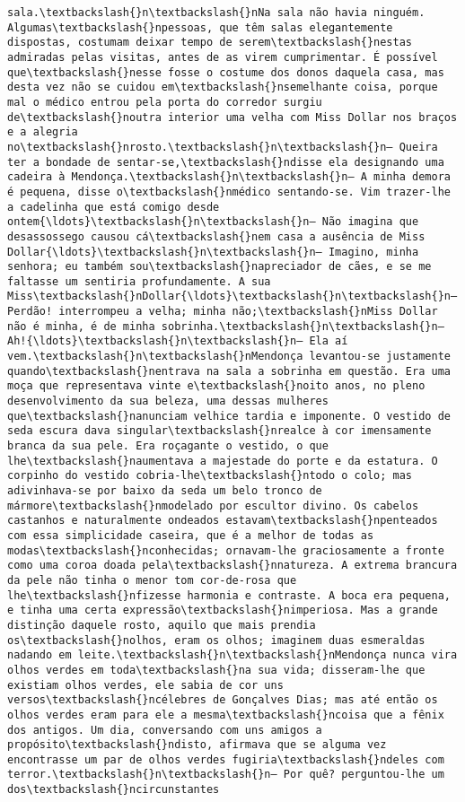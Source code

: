 \documentclass[11pt]{article}
\begin{document}
\begin{Verbatim}[commandchars=\\\{\}]
sala.\textbackslash{}n\textbackslash{}nNa sala não havia ninguém. Algumas\textbackslash{}npessoas, que têm salas elegantemente dispostas, costumam deixar tempo de serem\textbackslash{}nestas admiradas pelas visitas, antes de as virem cumprimentar. É possível que\textbackslash{}nesse fosse o costume dos donos daquela casa, mas desta vez não se cuidou em\textbackslash{}nsemelhante coisa, porque mal o médico entrou pela porta do corredor surgiu de\textbackslash{}noutra interior uma velha com Miss Dollar nos braços e a alegria no\textbackslash{}nrosto.\textbackslash{}n\textbackslash{}n— Queira ter a bondade de sentar-se,\textbackslash{}ndisse ela designando uma cadeira à Mendonça.\textbackslash{}n\textbackslash{}n— A minha demora é pequena, disse o\textbackslash{}nmédico sentando-se. Vim trazer-lhe a cadelinha que está comigo desde ontem{\ldots}\textbackslash{}n\textbackslash{}n— Não imagina que desassossego causou cá\textbackslash{}nem casa a ausência de Miss Dollar{\ldots}\textbackslash{}n\textbackslash{}n— Imagino, minha senhora; eu também sou\textbackslash{}napreciador de cães, e se me faltasse um sentiria profundamente. A sua Miss\textbackslash{}nDollar{\ldots}\textbackslash{}n\textbackslash{}n— Perdão! interrompeu a velha; minha não;\textbackslash{}nMiss Dollar não é minha, é de minha sobrinha.\textbackslash{}n\textbackslash{}n— Ah!{\ldots}\textbackslash{}n\textbackslash{}n— Ela aí vem.\textbackslash{}n\textbackslash{}nMendonça levantou-se justamente quando\textbackslash{}nentrava na sala a sobrinha em questão. Era uma moça que representava vinte e\textbackslash{}noito anos, no pleno desenvolvimento da sua beleza, uma dessas mulheres que\textbackslash{}nanunciam velhice tardia e imponente. O vestido de seda escura dava singular\textbackslash{}nrealce à cor imensamente branca da sua pele. Era roçagante o vestido, o que lhe\textbackslash{}naumentava a majestade do porte e da estatura. O corpinho do vestido cobria-lhe\textbackslash{}ntodo o colo; mas adivinhava-se por baixo da seda um belo tronco de mármore\textbackslash{}nmodelado por escultor divino. Os cabelos castanhos e naturalmente ondeados estavam\textbackslash{}npenteados com essa simplicidade caseira, que é a melhor de todas as modas\textbackslash{}nconhecidas; ornavam-lhe graciosamente a fronte como uma coroa doada pela\textbackslash{}nnatureza. A extrema brancura da pele não tinha o menor tom cor-de-rosa que lhe\textbackslash{}nfizesse harmonia e contraste. A boca era pequena, e tinha uma certa expressão\textbackslash{}nimperiosa. Mas a grande distinção daquele rosto, aquilo que mais prendia os\textbackslash{}nolhos, eram os olhos; imaginem duas esmeraldas nadando em leite.\textbackslash{}n\textbackslash{}nMendonça nunca vira olhos verdes em toda\textbackslash{}na sua vida; disseram-lhe que existiam olhos verdes, ele sabia de cor uns versos\textbackslash{}ncélebres de Gonçalves Dias; mas até então os olhos verdes eram para ele a mesma\textbackslash{}ncoisa que a fênix dos antigos. Um dia, conversando com uns amigos a propósito\textbackslash{}ndisto, afirmava que se alguma vez encontrasse um par de olhos verdes fugiria\textbackslash{}ndeles com terror.\textbackslash{}n\textbackslash{}n— Por quê? perguntou-lhe um dos\textbackslash{}ncircunstantes 
\end{Verbatim}
\end{document}
